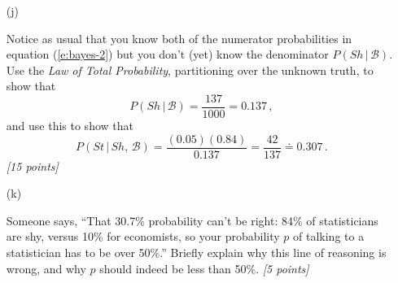 \documentclass[12pt]{article}
\newcommand{\given}{\, | \,}
\begin{document}
\begin{itemize}
\vspace*{0.5in}

\item[(j)]

Notice as usual that you know both of the numerator probabilities in equation (\ref{e:bayes-2}) but you don't (yet) know the denominator $P ( Sh \given \mathcal{ B } )$. Use the \textit{Law of Total Probability}, partitioning over the unknown truth, to show that
\begin{equation} \label{e:bayes-2}
P ( Sh \given \mathcal{ B } ) = \frac{ 137 }{ 1000 } = 0.137 \, ,
\end{equation}
and use this to show that
\begin{equation} \label{e:bayes-3}
P ( St \given Sh, \, \mathcal{ B } ) = \frac{ ( 0.05 ) ( 0.84 ) }{ 0.137 } = \frac{ 42 }{ 137 } \doteq 0.307 \, .
\end{equation}
\textit{[15 points]}

\vspace*{1.0in}

\item[(k)]

Someone says, ``That 30.7\% probability can't be right: 84\% of statisticians are shy, versus 10\% for economists, so your probability $p$ of talking to a statistician has to be over 50\%.'' Briefly explain why this line of reasoning is wrong, and why $p$ should indeed be less than 50\%. \textit{[5 points]}

\end{itemize}
\end{document}
